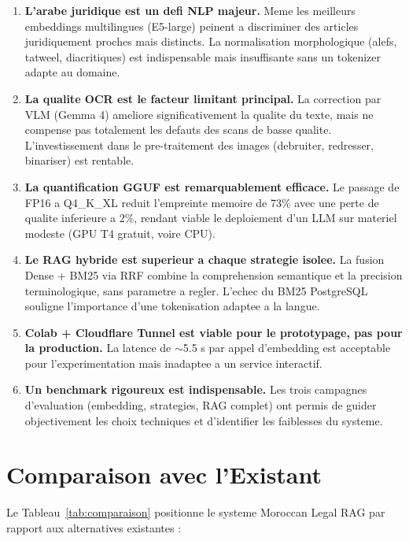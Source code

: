 \begin{enumerate}
    \item \textbf{L'arabe juridique est un defi NLP majeur.} Meme les meilleurs embeddings multilingues (E5-large) peinent a discriminer des articles juridiquement proches mais distincts. La normalisation morphologique (alefs, tatweel, diacritiques) est indispensable mais insuffisante sans un tokenizer adapte au domaine.

    \item \textbf{La qualite OCR est le facteur limitant principal.} La correction par VLM (Gemma 4) ameliore significativement la qualite du texte, mais ne compense pas totalement les defauts des scans de basse qualite. L'investissement dans le pre-traitement des images (debruiter, redresser, binariser) est rentable.

    \item \textbf{La quantification GGUF est remarquablement efficace.} Le passage de FP16 a Q4\_K\_XL reduit l'empreinte memoire de 73\% avec une perte de qualite inferieure a 2\%, rendant viable le deploiement d'un LLM sur materiel modeste (GPU T4 gratuit, voire CPU).

    \item \textbf{Le RAG hybride est superieur a chaque strategie isolee.} La fusion Dense + BM25 via RRF combine la comprehension semantique et la precision terminologique, sans parametre a regler. L'echec du BM25 PostgreSQL souligne l'importance d'une tokenisation adaptee a la langue.

    \item \textbf{Colab + Cloudflare Tunnel est viable pour le prototypage, pas pour la production.} La latence de $\sim$5.5 s par appel d'embedding est acceptable pour l'experimentation mais inadaptee a un service interactif.

    \item \textbf{Un benchmark rigoureux est indispensable.} Les trois campagnes d'evaluation (embedding, strategies, RAG complet) ont permis de guider objectivement les choix techniques et d'identifier les faiblesses du systeme.
\end{enumerate}

\section{Comparaison avec l'Existant}

Le Tableau~\ref{tab:comparaison} positionne le systeme Moroccan Legal RAG par rapport aux alternatives existantes :

